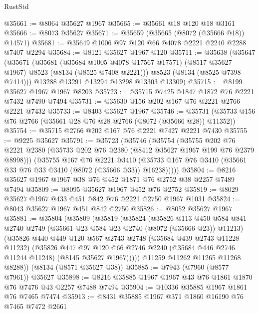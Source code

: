 \begin{lexlean}{RustStd}
\begin{coremodule}
@35661 := @8064 @35627 @1967
@35665 := @35661 @18 @120 @18 @3161
@35666 := @8073 @35627
@35671 := @35659 (@35665 (@8072 (@35666 @18)) @14571)
@35681 := @35649 @1006 @97 @120 @66 @4078 @2221 @2240 @2288 @7407 @2294
@35684 := @8121 @35627 @1967 @120
@35711 := @35638
    (@35647
      (@35671
        (@35681
          (@35684 @1005 @4078 @17567 @17571)
          (@8517 @35627 @1967)
          @8523
          (@8134 (@8525 @7408 @2221)))
        @8523
        (@8134 (@8525 @7398 @7414)))
      @13288
      @13291
      @13294
      @13298
      @13303
      @13309)
@35715 := @8199 @35627 @1967 @1967 @8203
@35723 := @35715 @7425 @1847 @1872 @76 @2221 @7432 @7490 @7494
@35731 := @35630 @156 @202 @167 @76 @2221 @2766 @2221 @7432
@35733 := @8403 @35627 @1967
@35746 := @35731 (@35733 @156 @76 @2766 (@35661 @28 @76 @28 @2766 (@8072 (@35666 @28)) @11352))
@35754 := @35715 @2766 @202 @167 @76 @2221 @7427 @2221 @7430
@35755 := @9225 @35627
@35791 := @35723
    (@35746
      (@35754
        (@35755
          @202
          @76
          @2221
          @2380
          (@35733 @202 @76 @2380 (@8412 @35627 @1967 @199 @76 @2379 @8998)))
        (@35755
          @167
          @76
          @2221
          @3410
          (@35733 @167 @76 @3410 (@35661 @33 @76 @33 @3410 (@8072 (@35666 @33)) @16238)))))
@35804 := @8216 @35627 @1967 @1967 @38 @76 @452 @1871 @76 @2752 @38 @2257 @7489 @7494
@35809 := @8095 @35627 @1967 @452 @76 @2752
@35819 := @8029 @35627 @1967 @433 @451 @842 @76 @2221 @2750 @1967 @1031
@35824 := @8043 @35627 @1967 @451 @842 @2750
@35826 := @8052 @35627 @1967
@35881 := @35804
    (@35809
      (@35819
        (@35824
          (@35826
            @113
            @450
            @584
            @841
            @2740
            @2749
            (@35661 @23 @584 @23 @2740 (@8072 (@35666 @23)) @11213)
            (@35826
              @440
              @449
              @120
              @567
              @2743
              @2748
              (@35684 @439 @2743 @11228 @11232)
              (@35826
                @447
                @97
                @120
                @66
                @2746
                @2240
                (@35684 @446 @2746 @11244 @11248)
                (@8145 @35627 @1967)))))
        @11259
        @11262
        @11265
        @11268
        @8288))
    (@8134 (@8571 @35627 @38))
@35885 := @7943 (@7960 (@8577 @7961)) @35627
@35898 := @8216 @35885 @1967 @1967 @43 @76 @1861 @1870 @76 @7476 @43 @2257 @7488 @7494
@35904 := @10336 @35885 @1967 @1861 @76 @7465 @7474
@35913 := @8431 @35885 @1967 @371 @1860 @16190 @76 @7465 @7472 @2661

\end{coremodule}
\end{lexlean}
